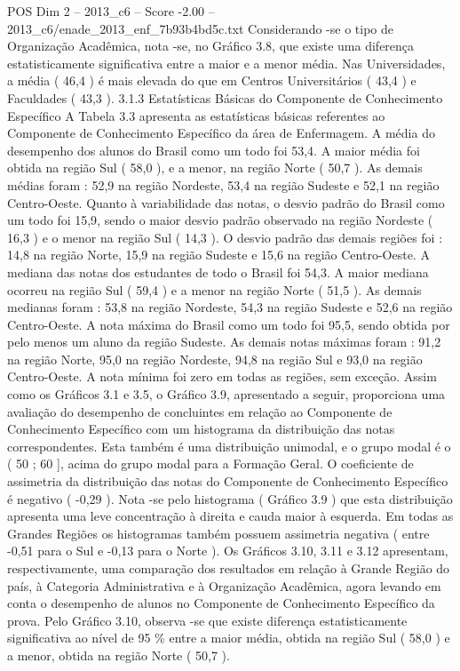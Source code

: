 \begin{textsample}{POS Dim 2 – 2013\_c6 – Score -2.00 – 2013\_c6/enade\_2013\_enf\_7b93b4bd5c.txt}
Considerando -se o tipo de Organização Acadêmica, nota -se, no Gráfico 3.8, que existe uma diferença estatisticamente significativa entre a maior e a menor média.
Nas Universidades, a média ( 46,4 ) é mais elevada do que em Centros Universitários ( 43,4 ) e Faculdades ( 43,3 ). 3.1.3 Estatísticas Básicas do Componente de Conhecimento Específico A Tabela 3.3 apresenta as estatísticas básicas referentes ao Componente de Conhecimento Específico da área de Enfermagem.
A média do desempenho dos alunos do Brasil como um todo foi 53,4.
A maior média foi obtida na região Sul ( 58,0 ), e a menor, na região Norte ( 50,7 ).
As demais médias foram : 52,9 na região Nordeste, 53,4 na região Sudeste e 52,1 na região Centro-Oeste.
Quanto à variabilidade das notas, o desvio padrão do Brasil como um todo foi 15,9, sendo o maior desvio padrão observado na região Nordeste ( 16,3 ) e o menor na região Sul ( 14,3 ).
O desvio padrão das demais regiões foi : 14,8 na região Norte, 15,9 na região Sudeste e 15,6 na região Centro-Oeste.
A mediana das notas dos estudantes de todo o Brasil foi 54,3.
A maior mediana ocorreu na região Sul ( 59,4 ) e a menor na região Norte ( 51,5 ).
As demais medianas foram : 53,8 na região Nordeste, 54,3 na região Sudeste e 52,6 na região Centro-Oeste.
A nota máxima do Brasil como um todo foi 95,5, sendo obtida por pelo menos um aluno da região Sudeste.
As demais notas máximas foram : 91,2 na região Norte, 95,0 na região Nordeste, 94,8 na região Sul e 93,0 na região Centro-Oeste.
A nota mínima foi zero em todas as regiões, sem exceção.
Assim como os Gráficos 3.1 e 3.5, o Gráfico 3.9, apresentado a seguir, proporciona uma avaliação do desempenho de concluintes em relação ao Componente de Conhecimento Específico com um histograma da distribuição das notas correspondentes.
Esta também é uma distribuição unimodal, e o grupo modal é o ( 50 ; 60 ], acima do grupo modal para a Formação Geral.
O coeficiente de assimetria da distribuição das notas do Componente de Conhecimento Específico é negativo ( -0,29 ).
Nota -se pelo histograma ( Gráfico 3.9 ) que esta distribuição apresenta uma leve concentração à direita e cauda maior à esquerda.
Em todas as Grandes Regiões os histogramas também possuem assimetria negativa ( entre -0,51 para o Sul e -0,13 para o Norte ).
Os Gráficos 3.10, 3.11 e 3.12 apresentam, respectivamente, uma comparação dos resultados em relação à Grande Região do país, à Categoria Administrativa e à Organização Acadêmica, agora levando em conta o desempenho de alunos no Componente de Conhecimento Específico da prova.
Pelo Gráfico 3.10, observa -se que existe diferença estatisticamente significativa ao nível de 95 \% entre a maior média, obtida na região Sul ( 58,0 ) e a menor, obtida na região Norte ( 50,7 ).

\end{textsample}
